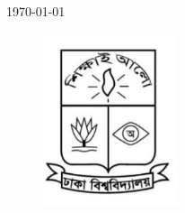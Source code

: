 \documentclass[12pt]{article}
\begin{document}
\begin{titlepage}

{\large \today}\\[2cm]


\begin{figure}[hb]
  \centering
  \includegraphics[width=4cm, height=5.2cm]{logo.JPG}
\end{figure}



\vfill

\end{titlepage}
\end{document}
